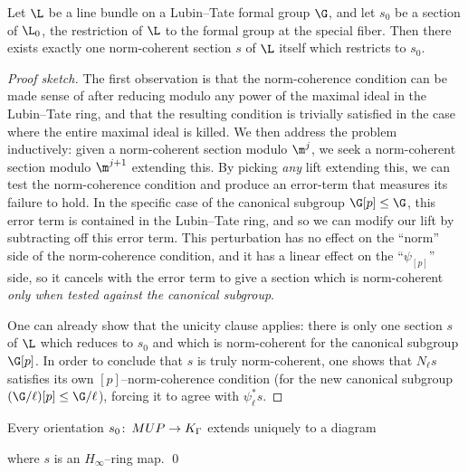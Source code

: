 \begin{theorem}\label{AndosAlgebraicTheorem}
Let $\L$ be a line bundle on a Lubin--Tate formal group $\G$, and let $s_0$ be a section of $\L_0$, the restriction of $\L$ to the formal group at the special fiber.  Then there exists exactly one norm-coherent section $s$ of $\L$ itself which restricts to $s_0$.
\end{theorem}
\begin{proof}[Proof sketch]
The first observation is that the norm-coherence condition can be made sense of after reducing modulo any power of the maximal ideal in the Lubin--Tate ring, and that the resulting condition is trivially satisfied in the case where the entire maximal ideal is killed.  We then address the problem inductively: given a norm-coherent section modulo $\m^j$, we seek a norm-coherent section modulo $\m^{j+1}$ extending this.  By picking \emph{any} lift extending this, we can test the norm-coherence condition and produce an error-term that measures its failure to hold.  In the specific case of the canonical subgroup $\G[p] \le \G$, this error term is contained in the Lubin--Tate ring, and so we can modify our lift by subtracting off this error term.  This perturbation has no effect on the ``norm'' side of the norm-coherence condition, and it has a linear effect on the ``$\psi_{[p]}$'' side, so it cancels with the error term to give a section which is norm-coherent \emph{only when tested against the canonical subgroup}.

One can already show that the unicity clause applies: there is only one section $s$ of $\L$ which reduces to $s_0$ and which is norm-coherent for the canonical subgroup $\G[p]$.  In order to conclude that $s$ is truly norm-coherent, one shows that $N_\ell s$ satisfies its own $[p]$--norm-coherence condition (for the new canonical subgroup $(\G / \ell)[p] \le \G / \ell$), forcing it to agree with $\psi_\ell^* s$.
\end{proof}

\begin{corollary}\label{AHSHinftyResultForEthy}
Every orientation $s_0\colon\thinspace MUP \to K_\Gamma$ extends uniquely to a diagram
\begin{center}
\end{center}
where $s$ is an $H_\infty$--ring map. \qed
\end{corollary}

